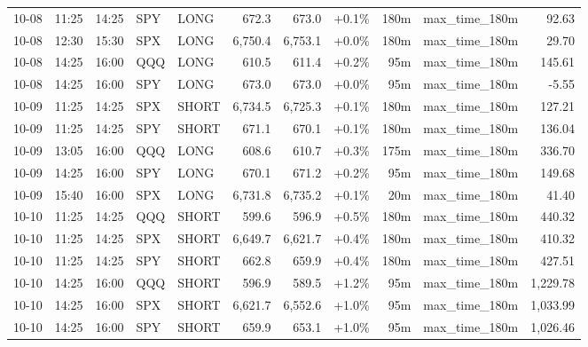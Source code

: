 \documentclass[11pt,a4paper,twoside]{article}
\begin{document}
\begin{center}
\begin{longtable}{>{\color{txtmain}}l l l l l r r r r >{\color{txtmain}}l r}
10-08 & 11:25 & 14:25 & SPY & LONG & 672.3 & 673.0 & \textcolor{wingreen}{+0.1\%} & 180m & max\_time\_180m & \textcolor{wingreen}{92.63} \\
10-08 & 12:30 & 15:30 & SPX & LONG & 6,750.4 & 6,753.1 & \textcolor{wingreen}{+0.0\%} & 180m & max\_time\_180m & \textcolor{wingreen}{29.70} \\
10-08 & 14:25 & 16:00 & QQQ & LONG & 610.5 & 611.4 & \textcolor{wingreen}{+0.2\%} & 95m & max\_time\_180m & \textcolor{wingreen}{145.61} \\
10-08 & 14:25 & 16:00 & SPY & LONG & 673.0 & 673.0 & \textcolor{wingreen}{+0.0\%} & 95m & max\_time\_180m & \textcolor{lossred}{-5.55} \\
10-09 & 11:25 & 14:25 & SPX & SHORT & 6,734.5 & 6,725.3 & \textcolor{wingreen}{+0.1\%} & 180m & max\_time\_180m & \textcolor{wingreen}{127.21} \\
10-09 & 11:25 & 14:25 & SPY & SHORT & 671.1 & 670.1 & \textcolor{wingreen}{+0.1\%} & 180m & max\_time\_180m & \textcolor{wingreen}{136.04} \\
10-09 & 13:05 & 16:00 & QQQ & LONG & 608.6 & 610.7 & \textcolor{wingreen}{+0.3\%} & 175m & max\_time\_180m & \textcolor{wingreen}{336.70} \\
10-09 & 14:25 & 16:00 & SPY & LONG & 670.1 & 671.2 & \textcolor{wingreen}{+0.2\%} & 95m & max\_time\_180m & \textcolor{wingreen}{149.68} \\
10-09 & 15:40 & 16:00 & SPX & LONG & 6,731.8 & 6,735.2 & \textcolor{wingreen}{+0.1\%} & 20m & max\_time\_180m & \textcolor{wingreen}{41.40} \\
10-10 & 11:25 & 14:25 & QQQ & SHORT & 599.6 & 596.9 & \textcolor{wingreen}{+0.5\%} & 180m & max\_time\_180m & \textcolor{wingreen}{440.32} \\
10-10 & 11:25 & 14:25 & SPX & SHORT & 6,649.7 & 6,621.7 & \textcolor{wingreen}{+0.4\%} & 180m & max\_time\_180m & \textcolor{wingreen}{410.32} \\
10-10 & 11:25 & 14:25 & SPY & SHORT & 662.8 & 659.9 & \textcolor{wingreen}{+0.4\%} & 180m & max\_time\_180m & \textcolor{wingreen}{427.51} \\
10-10 & 14:25 & 16:00 & QQQ & SHORT & 596.9 & 589.5 & \textcolor{wingreen}{+1.2\%} & 95m & max\_time\_180m & \textcolor{wingreen}{1,229.78} \\
10-10 & 14:25 & 16:00 & SPX & SHORT & 6,621.7 & 6,552.6 & \textcolor{wingreen}{+1.0\%} & 95m & max\_time\_180m & \textcolor{wingreen}{1,033.99} \\
10-10 & 14:25 & 16:00 & SPY & SHORT & 659.9 & 653.1 & \textcolor{wingreen}{+1.0\%} & 95m & max\_time\_180m & \textcolor{wingreen}{1,026.46} \\

\end{longtable}
\end{center}
\end{document}
